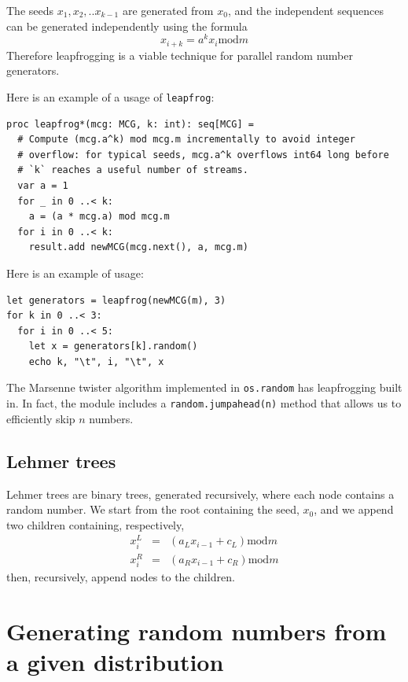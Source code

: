 \documentclass[justified, sixbynine]{tufte-book}
\def\ft{\small\tt}
\theoremstyle{plain}%
\newtheorem * {corollary}{Corollary}
\theoremstyle{definition}
\theoremstyle{remark}
\newtheorem * {remark}{Remark}
\newtheorem * {note}{Note}
\begin{document}
\begin{fullwidth}
The seeds $x_1, x_2, ..x_{k-1}$ are generated from $x_0$, and the independent
sequences can be generated independently using the formula
\begin{equation}
x_{i+k}=a^kx_i\textrm{mod}m
\end{equation}
Therefore leapfrogging is a viable technique for parallel random number
generators.

Here is an example of a usage of {\ft leapfrog}:

\begin{lstlisting}[caption={in file: {\ft nlib/randomgen.nim}}]
proc leapfrog*(mcg: MCG, k: int): seq[MCG] =
  # Compute (mcg.a^k) mod mcg.m incrementally to avoid integer
  # overflow: for typical seeds, mcg.a^k overflows int64 long before
  # `k` reaches a useful number of streams.
  var a = 1
  for _ in 0 ..< k:
    a = (a * mcg.a) mod mcg.m
  for i in 0 ..< k:
    result.add newMCG(mcg.next(), a, mcg.m)
\end{lstlisting}

Here is an example of usage:
\begin{lstlisting}
let generators = leapfrog(newMCG(m), 3)
for k in 0 ..< 3:
  for i in 0 ..< 5:
    let x = generators[k].random()
    echo k, "\t", i, "\t", x
\end{lstlisting}

The Marsenne twister algorithm implemented in {\ft os.random} has leapfrogging built in. In fact, the module includes a {\ft random.jumpahead(n)} method that allows us to efficiently skip $n$ numbers.

\goodbreak\subsection{Lehmer trees}

Lehmer trees are binary trees, generated recursively, where each node
contains a random number. We start from the root containing the seed, $x_0$, and
we append two children containing, respectively, 
\begin{eqnarray}
x_i^L &=&(a_Lx_{i-1}+c_L)\textrm{mod}m \\
x_i^R &=&(a_Rx_{i-1}+c_R)\textrm{mod}m
\end{eqnarray}
then, recursively, append nodes to the children.

\goodbreak\section{Generating random numbers from a given distribution}


\end{fullwidth}
\end{document}
